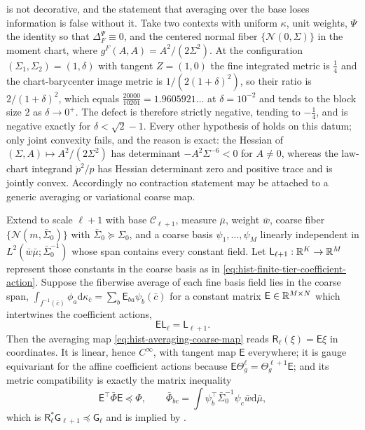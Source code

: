  is not decorative, and the statement that
averaging over the base loses information is false without it.  Take two
contexts with uniform $\kappa$, unit weights, $\Psi$ the identity so that
$\Delta_F^\Psi\equiv0$, and the centered normal fiber
$\{\mathcal N(0,\Sigma)\}$ in the moment chart, where
$g^F(A,A)=A^2/(2\Sigma^2)$.  At the configuration
$(\Sigma_1,\Sigma_2)=(1,\delta)$ with tangent $Z=(1,0)$ the fine integrated
metric is $\tfrac14$ and the chart-barycenter image metric is
$1/(2(1+\delta)^2)$, so their ratio is $2/(1+\delta)^2$, which equals
$\tfrac{20000}{10201}=1.9605921\ldots$ at $\delta=10^{-2}$ and tends to the
block size $2$ as $\delta\to0^+$.  The defect is therefore strictly negative,
tending to $-\tfrac14$, and is negative exactly for $\delta<\sqrt2-1$.  Every
other hypothesis of  holds on this datum; only
joint convexity fails, and the reason is exact: the Hessian of
$(\Sigma,A)\mapsto A^2/(2\Sigma^2)$ has determinant $-A^2\Sigma^{-6}<0$ for
$A\ne0$, whereas the law-chart integrand $\dot p^2/p$ has Hessian determinant
zero and positive trace and is jointly convex.  Accordingly no contraction
statement may be attached to a generic averaging or variational coarse map.

Extend  to scale $\ell+1$ with base
$\mathcal C_{\ell+1}$, measure $\bar\mu$, weight $\bar w$, coarse fiber
  $\{\mathcal N(m,\bar\Sigma_0)\}$ with $\bar\Sigma_0\succeq\Sigma_0$, and a
  coarse basis $\psi_1,\dots,\psi_M$ linearly independent in
  $L^2(\bar w\bar\mu;\bar\Sigma_0^{-1})$ whose span contains every constant
  field.  Let $\mathsf L_{\ell+1}:\mathbb R^K\to\mathbb R^M$ represent those constants in the
  coarse basis as in \eqref{eq:hist-finite-tier-coefficient-action}.  Suppose the fiberwise average of each
fine basis field lies in the coarse span,
$\int_{f^{-1}(\bar c)}\phi_a\mathrm d\kappa_{\bar c}
  =\sum_b\mathsf E_{ba}\psi_b(\bar c)$ for a constant matrix
  $\mathsf E\in\mathbb R^{M\times N}$ which intertwines the coefficient actions,
  \begin{equation}
  \mathsf E\mathsf L_\ell=\mathsf L_{\ell+1}.
  \label{eq:hist-finite-tier-coefficient-intertwining}
  \end{equation}
  Then
the averaging map \eqref{eq:hist-averaging-coarse-map} reads
$\mathsf R_\ell(\xi)=\mathsf E\xi$ in coordinates.  It is linear, hence
  $C^\infty$, with tangent map $\mathsf E$ everywhere; it is gauge equivariant
  for the affine coefficient actions because
  $\mathsf E\Theta^\ell_g=\Theta^{\ell+1}_g\mathsf E$;
and its metric compatibility is exactly the matrix inequality
\begin{equation}
\mathsf E^\top\bar\Phi\mathsf E\preceq\Phi,
\qquad
\bar\Phi_{bc}
=\int\psi_b^\top\bar\Sigma_0^{-1}\psi_c\bar w\mathrm d\bar\mu,
\label{eq:hist-coarse-map-compatibility}
\end{equation}
which is $\mathsf R_\ell^*\mathsf G_{\ell+1}\preceq\mathsf G_\ell$ and is
implied by .  

